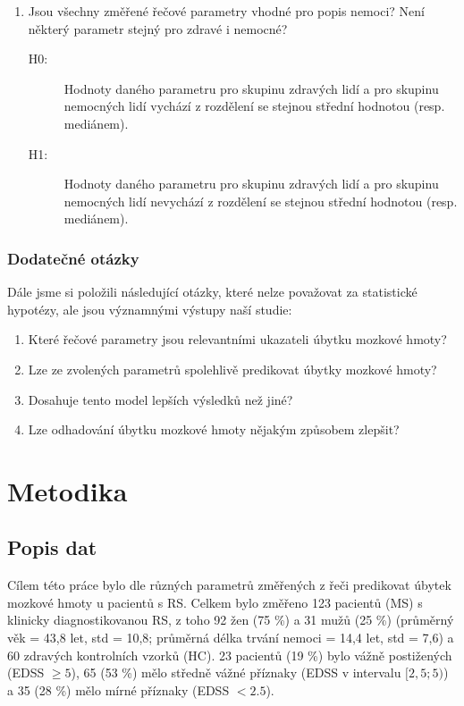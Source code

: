 \documentclass[11pt,a4paper]{article}
\begin{document}
\begin{enumerate}
\begin{description}
                        \end{description}
                    \item \label{en:vhodne}Jsou všechny změřené řečové parametry vhodné pro popis nemoci? Není některý parametr stejný pro zdravé i nemocné?
                        \begin{description}
                            \item[H0:] Hodnoty daného parametru pro skupinu zdravých lidí a pro skupinu nemocných lidí vychází z rozdělení se stejnou střední hodnotou (resp. mediánem).
                            \item[H1:] Hodnoty daného parametru pro skupinu zdravých lidí a pro skupinu nemocných lidí nevychází z rozdělení se stejnou střední hodnotou (resp. mediánem).
                        \end{description}
                \end{enumerate}
        \subsubsection*{Dodatečné otázky}
            Dále jsme si položili následující otázky, které nelze považovat za statistické hypotézy, ale jsou významnými výstupy naší studie:
            \begin{enumerate}
                \item \label{en:rel} Které řečové parametry jsou relevantními ukazateli úbytku mozkové hmoty?
                \item \label{en:predikt}Lze ze zvolených parametrů spolehlivě predikovat úbytky mozkové hmoty?
                \item \label{en:vysledky}Dosahuje tento model lepších výsledků než jiné?
                \item \label{en:odhad}Lze odhadování úbytku mozkové hmoty nějakým způsobem zlepšit?
            \end{enumerate}
                
    \section{Metodika}
        \subsection{Popis dat}
            Cílem této práce bylo dle různých parametrů změřených z řeči predikovat úbytek mozkové hmoty u pacientů s RS. Celkem bylo změřeno 123 pacientů (MS) s klinicky diagnostikovanou RS, z toho 92 žen (75 \%) a 31 mužů (25 \%) (průměrný věk = 43,8 let, std = 10,8; průměrná délka trvání nemoci = 14,4 let, std = 7,6) a 60 zdravých kontrolních vzorků (HC). 23 pacientů (19 \%) bylo vážně postižených (EDSS $\geq5$), 65 (53 \%) mělo středně vážné příznaky (EDSS v intervalu $[2,5;5)$) a 35 (28 \%) mělo mírné příznaky (EDSS $<2.5$).
\end{document}

